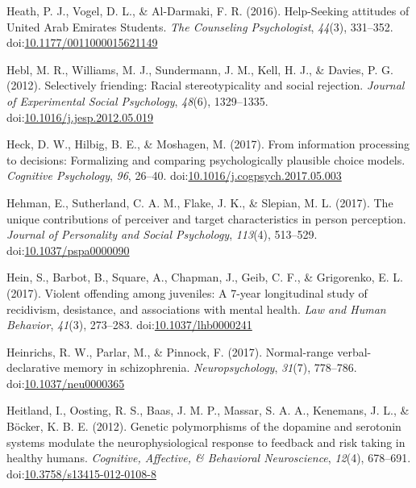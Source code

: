 \documentclass[english,man]{apa6}
\theoremstyle{definition}
\theoremstyle{definition}
\theoremstyle{definition}
\theoremstyle{remark}
\begin{document}
\hypertarget{ref-Heath2016}{}
Heath, P. J., Vogel, D. L., \& Al-Darmaki, F. R. (2016). Help-Seeking
attitudes of United Arab Emirates Students. \emph{The Counseling
Psychologist}, \emph{44}(3), 331--352.
doi:\href{https://doi.org/10.1177/0011000015621149}{10.1177/0011000015621149}

\hypertarget{ref-Hebl2012}{}
Hebl, M. R., Williams, M. J., Sundermann, J. M., Kell, H. J., \& Davies,
P. G. (2012). Selectively friending: Racial stereotypicality and social
rejection. \emph{Journal of Experimental Social Psychology},
\emph{48}(6), 1329--1335.
doi:\href{https://doi.org/10.1016/j.jesp.2012.05.019}{10.1016/j.jesp.2012.05.019}

\hypertarget{ref-Heck2017}{}
Heck, D. W., Hilbig, B. E., \& Moshagen, M. (2017). From information
processing to decisions: Formalizing and comparing psychologically
plausible choice models. \emph{Cognitive Psychology}, \emph{96}, 26--40.
doi:\href{https://doi.org/10.1016/j.cogpsych.2017.05.003}{10.1016/j.cogpsych.2017.05.003}

\hypertarget{ref-Hehman2017}{}
Hehman, E., Sutherland, C. A. M., Flake, J. K., \& Slepian, M. L.
(2017). The unique contributions of perceiver and target characteristics
in person perception. \emph{Journal of Personality and Social
Psychology}, \emph{113}(4), 513--529.
doi:\href{https://doi.org/10.1037/pspa0000090}{10.1037/pspa0000090}

\hypertarget{ref-Hein2017}{}
Hein, S., Barbot, B., Square, A., Chapman, J., Geib, C. F., \&
Grigorenko, E. L. (2017). Violent offending among juveniles: A 7-year
longitudinal study of recidivism, desistance, and associations with
mental health. \emph{Law and Human Behavior}, \emph{41}(3), 273--283.
doi:\href{https://doi.org/10.1037/lhb0000241}{10.1037/lhb0000241}

\hypertarget{ref-Heinrichs2017}{}
Heinrichs, R. W., Parlar, M., \& Pinnock, F. (2017). Normal-range
verbal-declarative memory in schizophrenia. \emph{Neuropsychology},
\emph{31}(7), 778--786.
doi:\href{https://doi.org/10.1037/neu0000365}{10.1037/neu0000365}

\hypertarget{ref-Heitland2012}{}
Heitland, I., Oosting, R. S., Baas, J. M. P., Massar, S. A. A.,
Kenemans, J. L., \& Böcker, K. B. E. (2012). Genetic polymorphisms of
the dopamine and serotonin systems modulate the neurophysiological
response to feedback and risk taking in healthy humans. \emph{Cognitive,
Affective, \& Behavioral Neuroscience}, \emph{12}(4), 678--691.
doi:\href{https://doi.org/10.3758/s13415-012-0108-8}{10.3758/s13415-012-0108-8}
\end{document}
